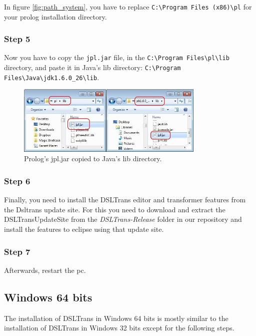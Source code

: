 In figure \ref{fig:path_system}, you have to replace \verb=C:\Program Files (x86)\pl= for your prolog installation
directory.

\subsubsection{Step 5}

Now you have to copy the \verb=jpl.jar= file, in the 
\verb=C:\Program Files\pl\lib= 
directory, and paste it in Java's lib directory: 
\verb=C:\Program Files\Java\jdk1.6.0_26\lib=.

\begin{figure}[h]
\begin{center}
  \includegraphics[width=0.8\textwidth]{imgs/jpl_cpy.jpg}
  \caption{Prolog's jpl.jar copied to Java's lib directory.}
  \label{fig:jpl_cpy}
\end{center}
\end{figure}

\subsubsection{Step 6}

Finally, you need to install the DSLTrans editor and transformer features from the Dsltrans update site.
For this you need to download and extract the DSLTransUpdateSite from the \emph{DSLTrans-Release} folder in our repository and install the features to eclipse using that update site.

\subsubsection{Step 7}

Afterwards, restart the pc.


\subsection{Windows 64 bits}

The installation of DSLTrans in Windows 64 bits is mostly similar to the installation of DSLTrans in Windows 32 bits except for the following steps.

